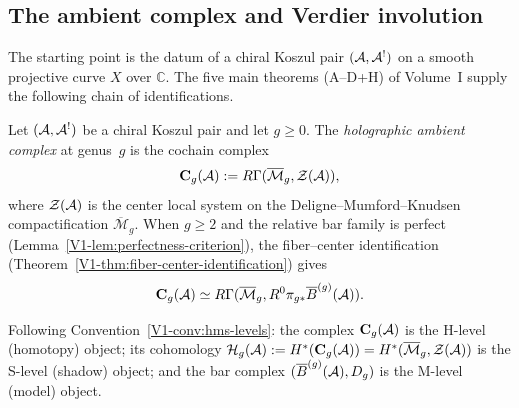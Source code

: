 %
%

\subsection{The ambient complex and Verdier involution}
\label{subsec:thqg-III-ambient-complex}

The starting point is the datum of a chiral Koszul pair
$(\mathcal{A}, \mathcal{A}^!)$ on a smooth projective curve $X$ over $\mathbb{C}$.
The five main theorems (A--D+H) of Volume~I supply the following
chain of identifications.

\begin{definition}
Let $(\mathcal{A}, \mathcal{A}^!)$ be a chiral Koszul pair and let $g \ge 0$.
The \emph{holographic ambient complex} at genus~$g$ is the cochain
complex
\begin{equation}%
\mathbf{C}_g(\cA)
:= \RGamma(\overline{\mathcal{M}}_g, \mathcal{Z}(\cA)),
\end{equation}
where $\mathcal{Z}(\mathcal{A})$ is the center local system on the
Deligne--Mumford--Knudsen compactification
$\overline{\mathcal{M}}_g$. When $g \ge 2$ and the relative bar
family is perfect
(Lemma~\ref{V1-lem:perfectness-criterion}), the fiber--center
identification
(Theorem~\ref{V1-thm:fiber-center-identification}) gives
\begin{equation}%
\mathbf{C}_g(\cA)
\simeq
\RGamma(\overline{\mathcal{M}}_g,
R^0\pi_{g*}\barB^{(g)}(\cA)).
\end{equation}
\end{definition}

\begin{remark}[H/M/S layers]%
Following Convention~\ref*{V1-conv:hms-levels}:
the complex $\mathbf{C}_g(\mathcal{A})$ is the H-level (homotopy)
object; its cohomology
$\mathcal{H}_g(\mathcal{A}) := H^*(\mathbf{C}_g(\mathcal{A}))
= H^*(\overline{\mathcal{M}}_g, \mathcal{Z}(\mathcal{A}))$
is the S-level (shadow) object; and the bar complex
$(\overline{B}^{(g)}(\mathcal{A}), D_{g})$ is the M-level (model) object.
\end{remark}

